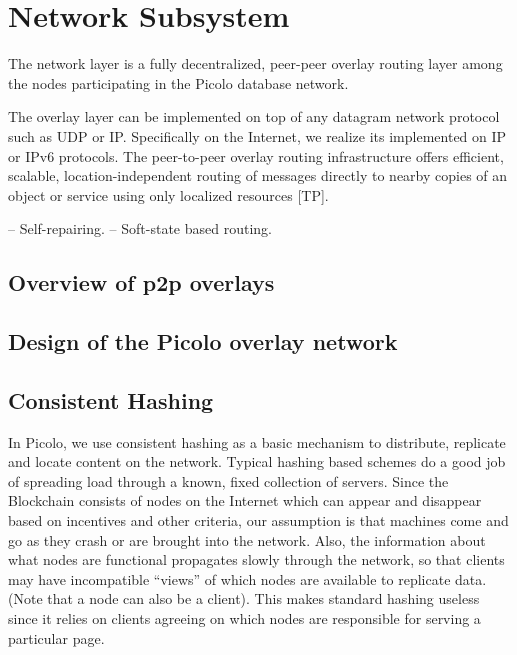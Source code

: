 \section{Network Subsystem} 

The network layer is a fully decentralized, peer-peer overlay routing layer among the nodes participating in the Picolo database network.

The overlay layer can be implemented on top of any datagram network protocol such as UDP or IP. Specifically on the Internet, we realize its implemented on IP or IPv6 protocols.
The peer-to-peer overlay routing infrastructure offers efficient, scalable, location-independent
routing of messages directly to nearby copies of an object or service using only localized resources [TP].

-- Self-repairing.
-- Soft-state based routing.

\subsection{Overview of p2p overlays}

\subsection{Design of the Picolo overlay network}

\subsection{Consistent Hashing} 

In Picolo, we use consistent hashing as a basic mechanism to distribute, replicate and locate content on the network.
Typical hashing based schemes do a good job of spreading load through a known, fixed collection of servers. Since the
Blockchain consists of nodes on the Internet which can appear and disappear based on incentives and other criteria, our
assumption is that machines come and go as they crash or are brought into the network. Also,
the information about what nodes are functional propagates slowly through the
network, so that clients may have incompatible “views” of which nodes are available to replicate data. (Note that a
node can also be a client). This makes standard hashing useless since it relies on clients agreeing on which nodes are responsible for serving a particular
page.


